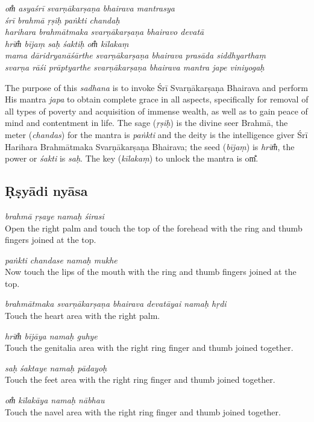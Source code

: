 \documentclass[12pt,oneside,a4paper]{article}
\newenvironment{shloka}[1]
  {\bigskip\center#1\varwidth{\linewidth}}
  {\endvarwidth\endcenter\bigskip}
\newcommand{\tl}[1]{\emph{#1}}
\begin{document}
\begin{shloka}\itshape
  om̐ asyaśrī svarṇākarṣaṇa bhairava mantrasya \\
  śrī brahmā ṛṣiḥ paṅkti chandaḥ \\
  harihara brahmātmaka svarṇākarṣaṇa bhairavo devatā \\
  hrīm̐ bījaṃ saḥ śaktiḥ om̐ kīlakaṃ \\
  mama dāridryanāśārthe svarṇākarṣaṇa bhairava prasāda siddhyarthaṃ \\
  svarṇa rāśi prāptyarthe svarṇākarṣaṇa bhairava mantra jape viniyogaḥ
\end{shloka}

The purpose of this \tl{sadhana} is to invoke Śrī Svarṇākarṣaṇa Bhairava and
perform His mantra \tl{japa} to obtain complete grace in all aspects,
specifically for removal of all types of poverty and acquisition of immense
wealth, as well as to gain peace of mind and contentment in life. The sage
(\tl{ṛṣiḥ}) is the divine seer Brahmā, the meter (\tl{chandas}) for the mantra
is \tl{paṅkti} and the deity is the intelligence giver Śrī Harihara Brahmātmaka
Svarṇākarṣaṇa Bhairava; the seed (\tl{bījaṃ}) is \tl{hrīm̐}, the power or
\tl{śakti} is \tl{saḥ}. The key (\tl{kīlakaṃ}) to unlock the mantra is om̐.

\subsection{Ṛṣyādi nyāsa}

\tl{brahmā ṛṣaye namaḥ śirasi}\\
Open the right palm and touch the top of the forehead with the ring and thumb
fingers joined at the top.

\tl{paṅkti chandase namaḥ mukhe}\\
Now touch the lips of the mouth with the ring and thumb fingers joined at
the top.

\tl{brahmātmaka svarṇākarṣaṇa bhairava devatāyai namaḥ hṛdi}\\
Touch the heart area with the right palm.

\tl{hrīm̐ bījāya namaḥ guhye}\\
Touch the genitalia area with the right ring finger and thumb joined together.

\tl{saḥ śaktaye namaḥ pādayoḥ}\\
Touch the feet area with the right ring finger and thumb joined together.

\tl{om̐ kīlakāya namaḥ nābhau}\\
Touch the navel area with the right ring finger and thumb joined together.
\end{document}
